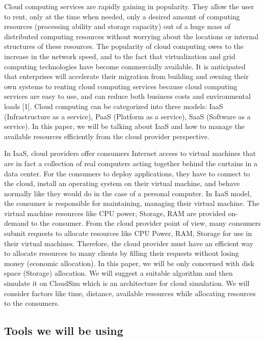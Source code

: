 \documentclass{article}
\begin{document}
Cloud computing services are rapidly gaining in popularity. They allow the user to rent, only at the time when needed, only a desired amount of computing resources (processing ability and storage capacity) out of a huge mass of distributed computing resources without worrying about the locations or internal structures of these resources. The popularity of cloud computing owes to the increase in the network speed, and to the fact that virtualization and grid computing technologies have become commercially available. It is anticipated that enterprises will accelerate their migration from building and owning their own systems to renting cloud computing services because cloud computing services are easy to use, and can reduce both business costs and environmental loads [1]. Cloud computing can be categorized into three models: IaaS (Infrastructure as a service), PaaS (Platform as a service), SaaS (Software as a service). In this paper, we will be talking about IaaS and how to manage the available resources efficiently from the cloud provider perspective.

In IaaS, cloud providers offer consumers Internet access to virtual machines that are in fact a collection of real computers acting together behind the curtains in a data center. For the consumers to deploy applications, they have to connect to the cloud, install an operating system on their virtual machine, and behave normally like they would do in the case of a personal computer. In IaaS model, the consumer is responsible for maintaining, managing their virtual machine. The virtual machine resources like CPU power, Storage, RAM are provided on-demand to the consumer. From the cloud provider point of view, many consumers submit requests to allocate resources like CPU Power, RAM, Storage for use in their virtual machines. Therefore, the cloud provider must have an efficient way to allocate resources to many clients by filling their requests without losing money (economic allocation). In this paper, we will be only concerned with disk space (Storage) allocation. We will suggest a suitable algorithm and then simulate it on CloudSim which is an architecture for cloud simulation. We will consider factors like time, distance, available resources while allocating resources to the consumers. 


\subsection{Tools we will be using}
\end{document}

